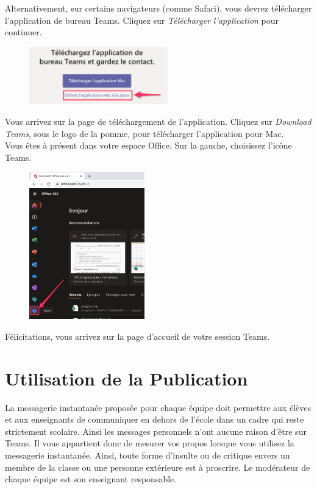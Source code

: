Alternativement, sur certains navigateurs (comme Safari), vous devrez télécharger l'application de bureau Teams. Cliquez sur \textit{Télécharger l'application} pour continuer.

\begin{figure}[H]
\includegraphics[width=6cm]{./images/teams/ecran_installer_teams_crop}
\centering
\end{figure}

Vous arrivez sur la page de téléchargement de l'application. Cliquez sur \textit{Download Teams}, sous le logo de la pomme, pour télécharger l'application pour Mac.\\

Vous êtes à présent dans votre espace Office. Sur la gauche, choisissez l'icône Teams.

\begin{figure}[H]
\includegraphics[width=5cm]{./images/teams/ecran_accueil_office_crop}
\centering
\end{figure}

Félicitations, vous arrivez sur la page d'accueil de votre session Teams.




\section{Utilisation de la Publication}

La messagerie instantanée proposée pour chaque équipe doit permettre aux élèves et aux enseignants de communiquer en dehors de l'école dans un cadre qui reste strictement scolaire. Ainsi les messages personnels n'ont aucune raison d'être sur Teams. Il vous appartient donc de mesurer vos propos lorsque vous utilisez la messagerie instantanée. Ainsi, toute forme d'insulte ou de critique envers un membre de la classe ou une personne extérieure est à proscrire. Le modérateur de chaque équipe est son enseignant responsable.\\

